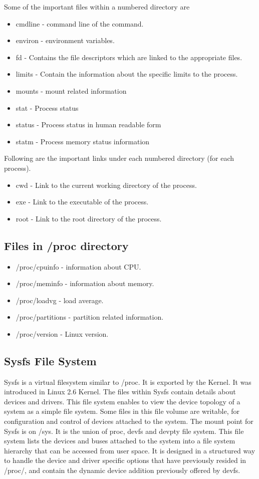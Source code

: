 \documentclass[12pt]{report}
\begin{document}
Some of the important files within a numbered directory are 
\begin{itemize}
	\item   cmdline - command line of the command.
	\item   environ - environment variables.
	\item   fd - Contains the file descriptors which are linked to the appropriate files.
	\item  limits - Contain the information about the specific limits to the process.
	\item mounts - mount related information
	\item stat - Process status
	\item status - Process status in human readable form
	\item statm - Process memory status information
\end{itemize}
Following are the important links under each numbered directory (for each process).

\begin{itemize}
	\item cwd - Link to the current working directory of the process.
	\item exe - Link to the executable of the process.
	\item root - Link to the root directory of the process.
\end{itemize}
\subsection{Files in /proc directory}

\begin{itemize}
	\item /proc/cpuinfo - information about CPU.
	\item /proc/meminfo - information about memory.
	\item /proc/loadvg  - load average.
	\item /proc/partitions - partition related information.
	\item /proc/version - Linux version.
\end{itemize}
\subsection{Sysfs File System}

Sysfs is a virtual filesystem  similar to /proc. It is exported by the Kernel. It was introduced in Linux 2.6 Kernel. The files within Sysfs contain details about devices and drivers. This file system enables to view the device topology of a system as a simple file system. Some files in this file volume are writable, for configuration and control of devices attached to the system. The mount point for Sysfs is on /sys. It is the union of proc, devfs and devpty file system. This file system lists the devices and buses attached to the system into a file system hierarchy that can be accessed from user space. It is designed in a structured way to handle the device and driver specific options that have previously resided in /proc/, and contain the dynamic device addition previously offered by devfs.
\end{document}
